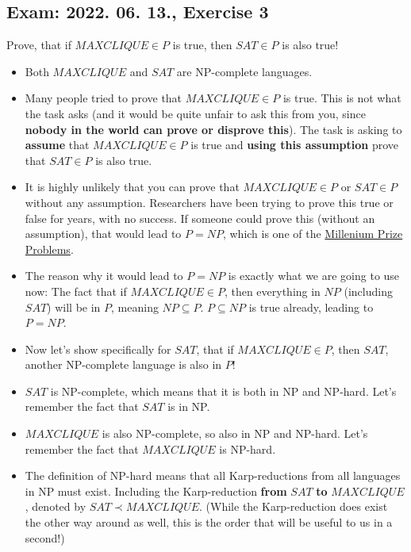 \subsection{Exam: 2022. 06. 13., Exercise 3}


Prove, that if $MAXCLIQUE \in{} P$ is true, then $SAT \in{} P$ is also true!


\begin{itemize}
    \item Both $MAXCLIQUE$ and $SAT$ are NP-complete languages.
    \item Many people tried to prove that $MAXCLIQUE \in{} P$ is true. This is not what the task asks (and it would be quite unfair to ask this from you, since \textbf{nobody in the world can prove or disprove this}). The task is asking to \textbf{assume} that $MAXCLIQUE \in{} P$ is true and \textbf{using this assumption} prove that $SAT \in{} P$ is also true.
    \item It is highly unlikely that you can prove that $MAXCLIQUE \in{} P$ or $SAT \in{} P$ without any assumption. Researchers have been trying to prove this true or false for years, with no success. If someone could prove this (without an assumption), that would lead to $P=NP$, which is one of the \href{https://en.wikipedia.org/wiki/Millennium_Prize_Problems}{Millenium Prize Problems}.
    \item The reason why it would lead to $P=NP$ is exactly what we are going to use now: The fact that if $MAXCLIQUE \in{} P$, then everything in $NP$ (including $SAT$) will be in $P$, meaning $NP \subseteq{} P$. $P \subseteq{} NP$ is true already, leading to $P = NP$.
    \item Now let's show specifically for $SAT$, that if $MAXCLIQUE \in{} P$, then $SAT$, another NP-complete language is also in $P$!
    \item $SAT$ is NP-complete, which means that it is both in NP and NP-hard. Let's remember the fact that $SAT$ is in NP.
    \item $MAXCLIQUE$ is also NP-complete, so also in NP and NP-hard. Let's remember the fact that $MAXCLIQUE$ is NP-hard.
    \item The definition of NP-hard means that all Karp-reductions from all languages in NP must exist. Including the Karp-reduction \textbf{from} $SAT$ \textbf{to} $MAXCLIQUE$, denoted by $SAT \prec MAXCLIQUE$. (While the Karp-reduction does exist the other way around as well, this is the order that will be useful to us in a second!)

\end{itemize}
